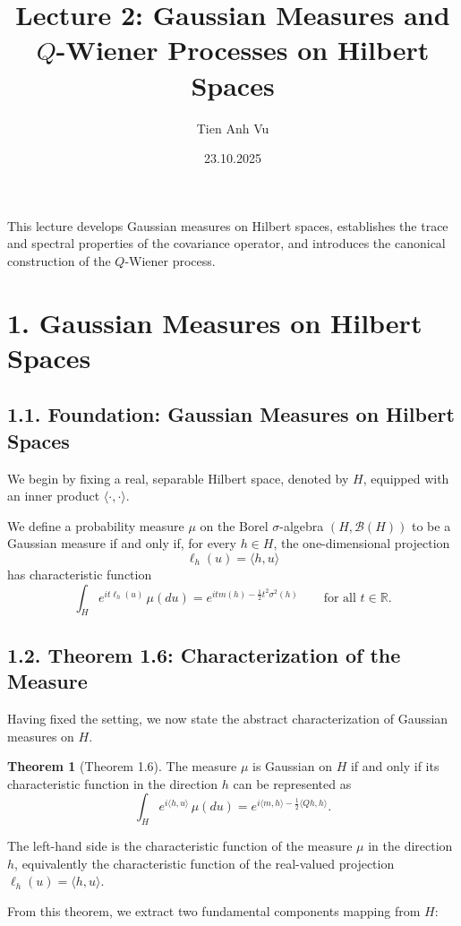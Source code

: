 \documentclass[11pt]{article}
\title{Lecture 2: Gaussian Measures and \(Q\)-Wiener Processes on Hilbert Spaces}
\date{23.10.2025}
\author{Tien Anh Vu}
\theoremstyle{definition}
\newtheorem{theorem}{Theorem}
\theoremstyle{remark}
\begin{document}
\maketitle

This lecture develops Gaussian measures on Hilbert spaces, establishes the trace and spectral properties of the covariance operator, and introduces the canonical construction of the \(Q\)-Wiener process.

\section*{1. Gaussian Measures on Hilbert Spaces}

\subsection*{1.1. Foundation: Gaussian Measures on Hilbert Spaces}
We begin by fixing a real, separable Hilbert space, denoted by $H$, equipped with an inner product $\langle \cdot,\cdot\rangle$.

We define a probability measure $\mu$ on the Borel $\sigma$-algebra $(H,\mathcal B(H))$ to be a Gaussian measure if and only if, for every $h\in H$, the one-dimensional projection
\[
\ell_h(u)=\langle h,u\rangle
\]
has characteristic function
\[
\int_H e^{it\ell_h(u)}\,\mu(du)=e^{itm(h)-\frac{1}{2}t^2\sigma^2(h)}
\qquad \text{for all } t\in\mathbb R.
\]

\subsection*{1.2. Theorem 1.6: Characterization of the Measure}
Having fixed the setting, we now state the abstract characterization of Gaussian measures on $H$.

\begin{theorem}[Theorem 1.6]
The measure $\mu$ is Gaussian on $H$ if and only if its characteristic function in the direction $h$ can be represented as
\[
\int_H e^{i\langle h,u\rangle}\,\mu(du)=e^{i\langle m,h\rangle-\frac{1}{2}\langle Qh,h\rangle}.
\]
\end{theorem}

The left-hand side is the characteristic function of the measure $\mu$ in the direction $h$, equivalently the characteristic function of the real-valued projection $\ell_h(u)=\langle h,u\rangle$.

From this theorem, we extract two fundamental components mapping from $H$:
\end{document}
